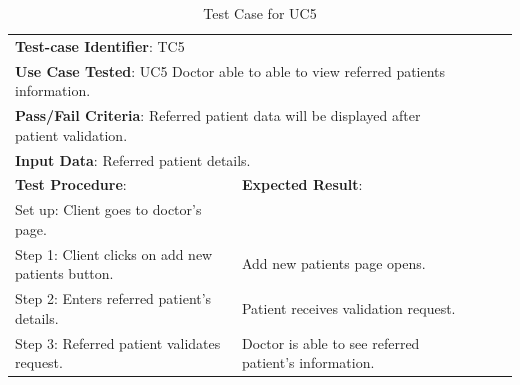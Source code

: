 \documentclass[a4paper]{article}
\begin{document}
\begin{table}[h!]
\centering
\caption*{Test Case for UC5}
\label{TC5}
\begin{tabular}{lllll}
\cline{1-2}

\multicolumn{2}{|l|}{\textbf{Test-case Identifier}: TC5}  &  &  &  \\

\multicolumn{2}{|l|}{\textbf{Use Case Tested}: UC5 Doctor able to able to view referred patients information.}  &  &  &  \\

\multicolumn{2}{|l|}{\textbf{Pass/Fail Criteria}: Referred patient data will be displayed after patient validation.}  &  &  &  \\

\multicolumn{2}{|l|}{\textbf{Input Data}: Referred patient details.}  &  &  &  \\

\cline{1-2}

\multicolumn{1}{|l|}{\textbf{Test Procedure}:} & \multicolumn{1}{l|}{\textbf{Expected Result}:} &  &  &  \\ 

\cline{1-2}

\multicolumn{1}{|l|}{Set up: Client goes to doctor's page.} & \multicolumn{1}{l|}{} &  &  &  \\

\multicolumn{1}{|l|}{Step 1: Client clicks on add new patients button.} & \multicolumn{1}{l|}{Add new patients page opens.} &  &  &  \\

\multicolumn{1}{|l|}{Step 2: Enters referred patient's details.} & \multicolumn{1}{l|}{Patient receives validation request.} &  &  &  \\

\multicolumn{1}{|l|}{Step 3: Referred patient validates request.} & \multicolumn{1}{l|}{Doctor is able to see referred patient's information.} &  &  &  \\

\cline{1-2}

\end{tabular}
\end{table}

\FloatBarrier
\end{document}
